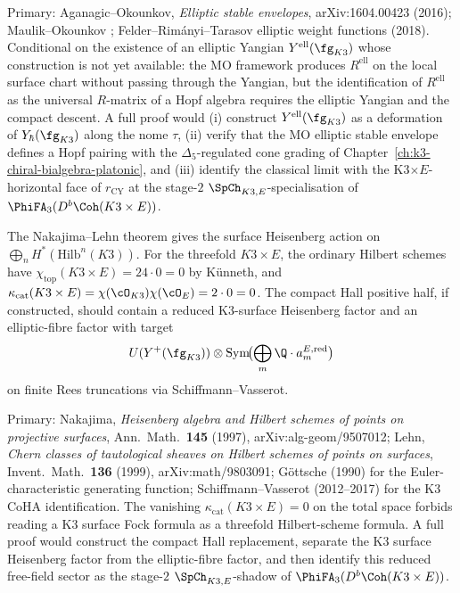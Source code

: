 Primary: Aganagic--Okounkov, \emph{Elliptic stable envelopes},
arXiv:1604.00423 (2016); Maulik--Okounkov
\cite{MaulikOkounkov2019}; Felder--Rim\'anyi--Tarasov elliptic weight
functions (2018). Conditional on the existence of an elliptic
Yangian $Y^{\mathrm{ell}}(\fg_{K3})$ whose construction is not yet
available: the MO framework produces \(R^{\mathrm{ell}}\) on the local
surface chart without passing through the Yangian, but the
identification of \(R^{\mathrm{ell}}\) as the universal \(R\)-matrix of a
Hopf algebra requires the elliptic Yangian and the compact descent.
A full proof would (i) construct $Y^{\mathrm{ell}}(\fg_{K3})$ as a
deformation of $Y_\hbar(\fg_{K3})$ along the nome $\tau$, (ii) verify
that the MO elliptic stable envelope defines a Hopf pairing with the
$\Delta_5$-regulated cone grading of
Chapter~\ref{ch:k3-chiral-bialgebra-platonic}, and (iii) identify the
classical limit with the K3$\times E$-horizontal face of
$r_{\mathrm{CY}}$ at the stage-$2$
$\SpCh_{K3,E}$-specialisation of $\PhiFA_3(D^b\Coh(K3\times E))$.

\begin{conjecture}
\label{conj:k3y-nakajima-lehn-hilbert-programme}
\ClaimStatusConjectured
The Nakajima--Lehn theorem gives the surface Heisenberg action on
\(\bigoplus_n H^\ast(\mathrm{Hilb}^n(K3))\). For the threefold
\(K3\times E\), the ordinary Hilbert schemes have
\(\chi_{\mathrm{top}}(K3\times E)=24\cdot0=0\) by K\"unneth, and
\(\kappa_{\mathrm{cat}}(K3\times E)=\chi(\cO_{K3})\chi(\cO_E)=2\cdot0=0\).
The compact Hall positive half, if constructed, should contain a
reduced K3-surface Heisenberg factor and an elliptic-fibre factor with
target
\[
U(Y^+(\fg_{K3}))\otimes
\mathrm{Sym}\!\bigl(\bigoplus_m \Q\cdot a_m^{E,\mathrm{red}}\bigr)
\]
on finite Rees truncations via Schiffmann--Vasserot.
\end{conjecture}

Primary: Nakajima, \emph{Heisenberg algebra and Hilbert schemes of
points on projective surfaces}, Ann.\ Math.\ \textbf{145} (1997),
arXiv:alg-geom/9507012; Lehn, \emph{Chern classes of tautological
sheaves on Hilbert schemes of points on surfaces}, Invent.\ Math.\
\textbf{136} (1999), arXiv:math/9803091; G\"ottsche (1990) for the
Euler-characteristic generating function; Schiffmann--Vasserot
(2012--2017) for the K3 CoHA identification. The vanishing
\(\kappa_{\mathrm{cat}}(K3\times E)=0\) on the total space forbids
reading a K3 surface Fock formula as a threefold Hilbert-scheme
formula. A full proof would construct the compact Hall replacement,
separate the K3 surface Heisenberg factor from the elliptic-fibre
factor, and then identify this reduced free-field sector as the
stage-\(2\) \(\SpCh_{K3,E}\)-shadow of
\(\PhiFA_3(D^b\Coh(K3\times E))\).

